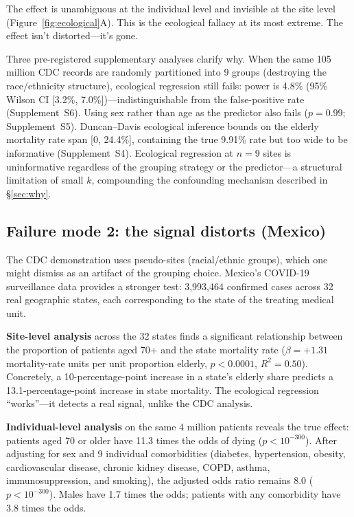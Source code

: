 \documentclass{article}
\begin{document}
The effect is unambiguous at the individual level and invisible at the site
level (Figure~\ref{fig:ecological}A).  This is the ecological fallacy at its most extreme.  The effect
isn't distorted---it's gone.

Three pre-registered supplementary analyses clarify why.  When the same
105 million CDC records are randomly partitioned into 9 groups (destroying
the race/ethnicity structure), ecological regression still fails:
power is 4.8\% (95\% Wilson CI [3.2\%, 7.0\%])---indistinguishable from
the false-positive rate (Supplement~S6).  Using sex rather than age as the
predictor also fails ($p = 0.99$; Supplement~S5).  Duncan--Davis ecological
inference bounds on the elderly mortality rate span [0, 24.4\%], containing
the true 9.91\% rate but too wide to be informative (Supplement~S4).
Ecological regression at $n = 9$ sites is uninformative regardless
of the grouping strategy or the predictor---a structural limitation of
small $k$, compounding the confounding mechanism described in \S\ref{sec:why}.


\subsection{Failure mode 2: the signal distorts (Mexico)}

The CDC demonstration uses pseudo-sites (racial/ethnic groups), which one
might dismiss as an artifact of the grouping choice.  Mexico's COVID-19
surveillance data provides a stronger test: 3,993,464 confirmed cases across
32 real geographic states, each corresponding to the state of the treating
medical unit.

\textbf{Site-level analysis} across the 32 states finds a significant
relationship between the proportion of patients aged 70+ and the state
mortality rate ($\beta = +1.31$ mortality-rate units per unit proportion
elderly, $p < 0.0001$, $R^2 = 0.50$).  Concretely, a 10-percentage-point
increase in a state's elderly share predicts a 13.1-percentage-point
increase in state mortality.  The ecological regression
``works''---it detects a real signal, unlike the CDC analysis.

\textbf{Individual-level analysis} on the same 4 million patients reveals the
true effect: patients aged 70 or older have 11.3 times the odds of dying
($p < 10^{-300}$).  After adjusting for sex and 9 individual comorbidities
(diabetes, hypertension, obesity, cardiovascular disease, chronic kidney
disease, COPD, asthma, immunosuppression, and smoking), the adjusted odds
ratio remains 8.0 ($p < 10^{-300}$).  Males have 1.7 times the odds;
patients with any comorbidity have 3.8 times the odds.
\end{document}
